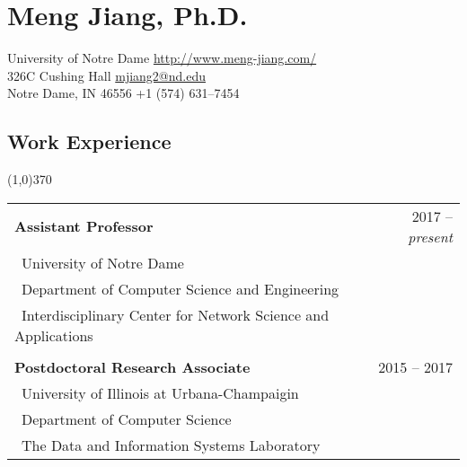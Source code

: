 \documentclass[10pt]{article}
\begin{document}
\setcounter{secnumdepth}{0}

\thispagestyle{firststyle}

\section{\LARGE{\sc Meng Jiang, Ph.D.}}
University of Notre Dame \hfill \url{http://www.meng-jiang.com/} \\
326C Cushing Hall \hfill \url{mjiang2@nd.edu}\\
Notre Dame, IN 46556 \hfill +1 (574) 631--7454



\subsection{\sc Work Experience}
\vspace{-0.4cm} \line(1,0){370} \vspace{0.1cm}

\begin{table}[h!]
\begin{tabular*}{12.7cm}{p{6.5cm}p{1.25cm}r}
\bf{Assistant Professor}&~&~~2017 -- \emph{present}\\
 \multicolumn{2}{l}{~{University of Notre Dame}}\\
 \multicolumn{2}{l}{~{Department of Computer Science and Engineering}}\\
 \multicolumn{2}{l}{~{Interdisciplinary Center for Network Science and Applications}}\\
\\
\bf{Postdoctoral Research Associate}&~&~~2015 -- 2017\\
 \multicolumn{2}{l}{~{University of Illinois at Urbana-Champaigin}}\\
 \multicolumn{2}{l}{~{Department of Computer Science}}\\
 \multicolumn{2}{l}{~{The Data and Information Systems Laboratory}}
\end{tabular*}
\end{table}
\vspace{-0.4cm}
\end{document}

